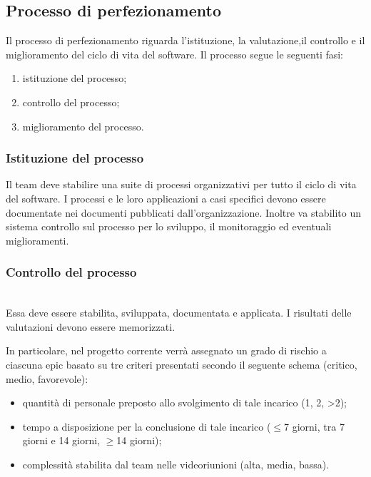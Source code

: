 \subsection{Processo di perfezionamento}
Il processo di perfezionamento riguarda l'istituzione, la valutazione,il controllo e il miglioramento del ciclo di vita del software. Il processo segue le seguenti fasi:

\begin{enumerate}
    \item istituzione del processo;
    \item controllo del processo;
    \item miglioramento del processo.
\end{enumerate}

\subsubsection{Istituzione del processo}
Il team deve stabilire una suite di processi organizzativi per tutto il ciclo di vita del software. I processi e le loro applicazioni a casi specifici devono essere documentate nei documenti pubblicati dall'organizzazione. Inoltre va stabilito un sistema controllo sul processo per lo sviluppo, il monitoraggio ed eventuali miglioramenti.

\subsubsection{Controllo del processo}

\leavevmode \\ Essa deve essere stabilita, sviluppata, documentata e applicata. I risultati delle valutazioni devono essere memorizzati.

In particolare, nel progetto corrente verrà assegnato un grado di rischio a ciascuna epic basato su tre criteri presentati secondo il seguente schema (critico, medio, favorevole):

\begin{itemize}
    \item quantità di personale preposto allo svolgimento di tale incarico (1, 2, >2);
    \item tempo a disposizione per la conclusione di tale incarico ($\leq$7 giorni, tra 7 giorni e 14 giorni, $\geq$14 giorni);
    \item complessità stabilita dal team nelle videoriunioni (alta, media, bassa).
\end{itemize}

